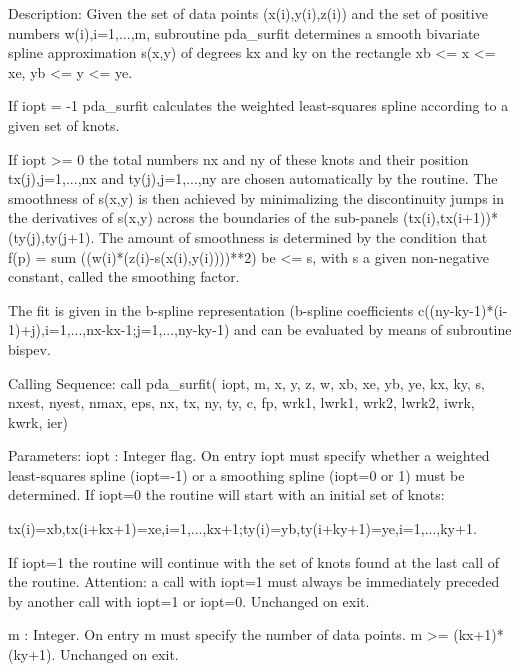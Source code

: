 \documentclass[11pt,twoside,nolof]{starlink}
\begin{document}

\begin{terminalv}
Description:
   Given the set of data points (x(i),y(i),z(i)) and the set of positive
   numbers w(i),i=1,...,m, subroutine pda_surfit determines a smooth
   bivariate spline approximation s(x,y) of degrees kx and ky on the
   rectangle xb <= x <= xe, yb <= y <= ye.

   If iopt = -1 pda_surfit calculates the weighted least-squares spline
   according to a given set of knots.

   If iopt >= 0 the total numbers nx and ny of these knots and their
   position tx(j),j=1,...,nx and ty(j),j=1,...,ny are chosen automatically
   by the routine. The smoothness of s(x,y) is then achieved by minimalizing
   the discontinuity jumps in the derivatives of s(x,y) across the
   boundaries of the sub-panels (tx(i),tx(i+1))*(ty(j),ty(j+1). The amount of
   smoothness is determined by the condition that f(p) = sum
   ((w(i)*(z(i)-s(x(i),y(i))))**2) be <= s, with s a given non-negative
   constant, called the smoothing factor.

   The fit is given in the b-spline representation (b-spline coefficients
   c((ny-ky-1)*(i-1)+j),i=1,...,nx-kx-1;j=1,...,ny-ky-1) and can be
   evaluated by means of subroutine bispev.

Calling Sequence:
   call pda_surfit( iopt, m, x, y, z, w, xb, xe, yb, ye, kx, ky, s, nxest,
                    nyest, nmax, eps, nx, tx, ny, ty, c, fp, wrk1, lwrk1,
                    wrk2, lwrk2, iwrk, kwrk, ier)

Parameters:
   iopt  : Integer flag. On entry iopt must specify whether a weighted
           least-squares spline (iopt=-1) or a smoothing spline (iopt=0
           or 1) must be determined. If iopt=0 the routine will start with
           an initial set of knots:

   tx(i)=xb,tx(i+kx+1)=xe,i=1,...,kx+1;ty(i)=yb,ty(i+ky+1)=ye,i=1,...,ky+1.

           If iopt=1 the routine will continue with the set of knots found
           at the last call of the routine. Attention: a call with iopt=1
           must always be immediately preceded by another call with iopt=1
           or iopt=0. Unchanged on exit.

   m     : Integer. On entry m must specify the number of data points.
           m >= (kx+1)*(ky+1). Unchanged on exit.


\end{terminalv}
\end{document}
